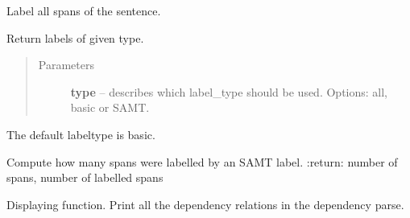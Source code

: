 \documentclass[letterpaper,10pt,english]{sphinxmanual}
\begin{document}
\begin{fulllineitems}
\begin{fulllineitems}
\end{fulllineitems}


\begin{fulllineitems}
\label{dependencies:dependencies.Dependencies.label_all}
Label all spans of the sentence.

\end{fulllineitems}


\begin{fulllineitems}
\label{dependencies:dependencies.Dependencies.labels}
Return labels of given type.
\begin{quote}\begin{description}
\item[{Parameters}] \leavevmode
\textbf{type} -- describes which label\_type should be used. Options: all, basic or SAMT.

\end{description}\end{quote}

The default labeltype is basic.

\end{fulllineitems}


\begin{fulllineitems}
\label{dependencies:dependencies.Dependencies.percentage_SAMT}
Compute how many spans were labelled by
an SAMT label.
:return:        number of spans, number of labelled spans

\end{fulllineitems}


\begin{fulllineitems}
\label{dependencies:dependencies.Dependencies.print_deps}
Displaying function. Print all the
dependency relations in the dependency
parse.

\end{fulllineitems}



\end{fulllineitems}
\end{document}
